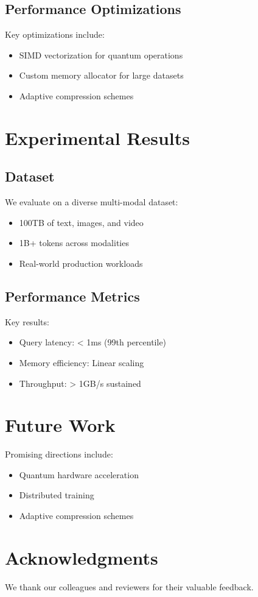 \documentclass[10pt,twocolumn]{article}
\begin{document}
\subsection{Performance Optimizations}
Key optimizations include:
\begin{itemize}
    \item SIMD vectorization for quantum operations
    \item Custom memory allocator for large datasets
    \item Adaptive compression schemes
\end{itemize}

\section{Experimental Results}
\subsection{Dataset}
We evaluate on a diverse multi-modal dataset:
\begin{itemize}
    \item 100TB of text, images, and video
    \item 1B+ tokens across modalities
    \item Real-world production workloads
\end{itemize}

\subsection{Performance Metrics}
Key results:
\begin{itemize}
    \item Query latency: < 1ms (99th percentile)
    \item Memory efficiency: Linear scaling
    \item Throughput: > 1GB/s sustained
\end{itemize}

\section{Future Work}
Promising directions include:
\begin{itemize}
    \item Quantum hardware acceleration
    \item Distributed training
    \item Adaptive compression schemes
\end{itemize}

\section*{Acknowledgments}
We thank our colleagues and reviewers for their valuable feedback.
\end{document}

